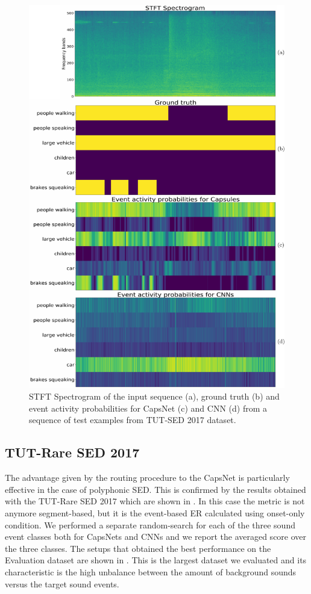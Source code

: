 \begin{figure}[h]
	\centering
	\includegraphics[width=0.5\columnwidth]{img/activations_17_v2}
	\caption[Polyphonic SED - Network outputs II]{STFT Spectrogram of the input sequence (a), ground truth (b) and event activity probabilities for CapsNet (c) and CNN (d) from a sequence of test examples from TUT-SED 2017 dataset.}
	\label{fig:activations_17}
\end{figure}

\subsection{TUT-Rare SED 2017}
The advantage given by the routing procedure to the CapsNet is particularly effective in the case of polyphonic SED. This is confirmed by the results obtained with the TUT-Rare SED 2017 which are shown in . In this case the metric is not anymore segment-based, but it is the event-based ER calculated using onset-only condition. We performed a separate random-search for each of the three sound event classes both for CapsNets and CNNs and we report the averaged score over the three classes. The setups that obtained the best performance on the Evaluation dataset are shown in . This is the largest dataset we evaluated and its characteristic is the high unbalance between the amount of background sounds versus the target sound events.

